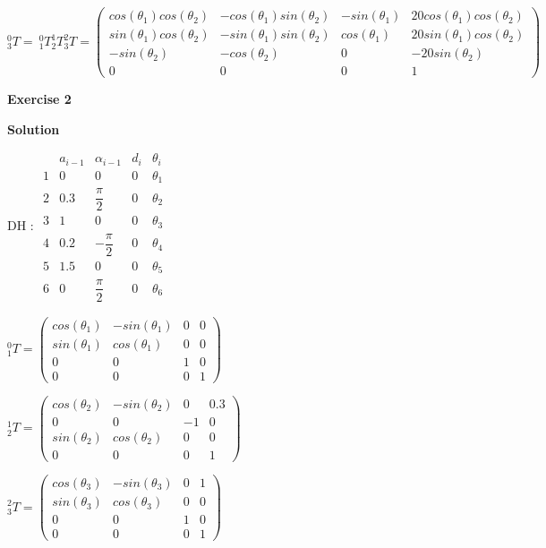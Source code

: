 \documentclass[8pt]{article}
\begin{document}
$^0_3T = \ ^0_1T ^1_2T ^2_3T = \left( \begin{array}{cccc}
cos(\theta_1) cos(\theta_2) & -cos(\theta_1) sin(\theta_2) & -sin(\theta_1) & 20cos(\theta_1) cos(\theta_2) \\
sin(\theta_1) cos(\theta_2) & - sin(\theta_1) sin(\theta_2) & cos(\theta_1) & 20 sin(\theta_1) cos(\theta_2) \\
-sin(\theta_2) & -cos(\theta_2) & 0 & -20 sin(\theta_2) \\
0 & 0 & 0 & 1
\end{array} \right) $

\textbf{Exercise 2}		
		
\textbf{Solution}

\medskip

\begin{list}{()~}{}
\item
DH :
$ \begin{array}{ccccc}
& a_{i-1} & \alpha_{i-1} & d_i & \theta_i \\
1& 0 & 0 & 0 & \theta_1 \\
2& 0.3 & \dfrac{\pi}{2} & 0 & \theta_2 \\
3& 1 & 0 & 0 & \theta_3 \\
4& 0.2 & - \dfrac{\pi}{2} & 0 & \theta_4 \\
5& 1.5 & 0 & 0 & \theta_5 \\
6& 0 & \dfrac{\pi}{2} & 0 & \theta_6
\end{array} $

$^0_1T = \left( \begin{array}{cccc}
cos(\theta_1) & -sin(\theta_1) & 0 & 0 \\
sin(\theta_1) & cos(\theta_1) & 0 & 0 \\
0 & 0 & 1 & 0 \\
0 & 0 & 0 & 1
\end{array} \right) $

$^1_2T = \left( \begin{array}{cccc}
cos(\theta_2) & -sin(\theta_2) & 0 & 0.3 \\
0 & 0 & -1 & 0 \\
sin(\theta_2) & cos(\theta_2) & 0 & 0 \\
0 & 0 & 0 & 1
\end{array} \right) $

$^2_3T = \left( \begin{array}{cccc}
cos(\theta_3) & -sin(\theta_3) & 0 & 1 \\
sin(\theta_3) & cos(\theta_3) & 0 & 0 \\
0 & 0 & 1 & 0 \\
0 & 0 & 0 & 1
\end{array} \right) $


\end{list}
\end{document}
